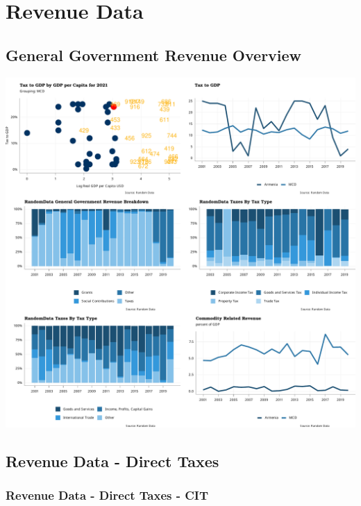 \documentclass[
]{article}
\begin{document}
\hypertarget{revenue-data}{%
\section{Revenue Data}\label{revenue-data}}

\hypertarget{general-government-revenue-overview}{%
\subsection{General Government Revenue
Overview}\label{general-government-revenue-overview}}

\begin{center}\includegraphics{RandomData_MCD__files/figure-latex/01_scatter_WEO_WoRLD_TaxGDP_to_GDPPC-1} \end{center}
\newpage

\hypertarget{revenue-data---direct-taxes}{%
\subsection{Revenue Data - Direct
Taxes}\label{revenue-data---direct-taxes}}

\hypertarget{revenue-data---direct-taxes---cit}{%
\subsubsection{Revenue Data - Direct Taxes -
CIT}\label{revenue-data---direct-taxes---cit}}
\end{document}
